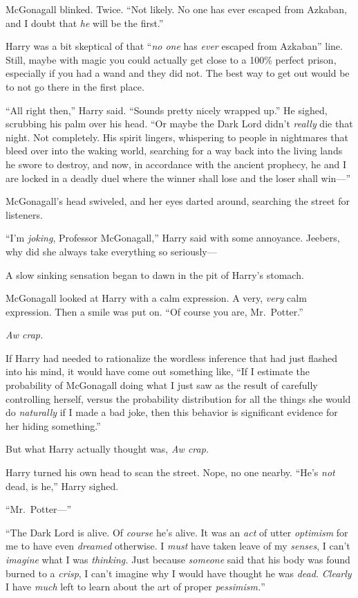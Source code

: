 McGonagall blinked. Twice. “Not likely. No one has ever escaped from Azkaban, and I doubt that \emph{he} will be the first.”

Harry was a bit skeptical of that “\emph{no one} has \emph{ever} escaped from Azkaban” line. Still, maybe with magic you could actually get close to a 100\% perfect prison, especially if you had a wand and they did not. The best way to get out would be to not go there in the first place.

“All right then,” Harry said. “Sounds pretty nicely wrapped up.” He sighed, scrubbing his palm over his head. “Or maybe the Dark Lord didn’t \emph{really} die that night. Not completely. His spirit lingers, whispering to people in nightmares that bleed over into the waking world, searching for a way back into the living lands he swore to destroy, and now, in accordance with the ancient prophecy, he and I are locked in a deadly duel where the winner shall lose and the loser shall win—”

McGonagall’s head swiveled, and her eyes darted around, searching the street for listeners.

“I’m \emph{joking}, Professor McGonagall,” Harry said with some annoyance. Jeebers, why did she always take everything so seriously—

A slow sinking sensation began to dawn in the pit of Harry’s stomach.

McGonagall looked at Harry with a calm expression. A very, \emph{very} calm expression. Then a smile was put on. “Of course you are, Mr.~Potter.”

\emph{Aw crap.}

If Harry had needed to rationalize the wordless inference that had just flashed into his mind, it would have come out something like, “If I estimate the probability of McGonagall doing what I just saw as the result of carefully controlling herself, versus the probability distribution for all the things she would do \emph{naturally} if I made a bad joke, then this behavior is significant evidence for her hiding something.”

But what Harry actually thought was, \emph{Aw crap.}

Harry turned his own head to scan the street. Nope, no one nearby. “He’s \emph{not} dead, is he,” Harry sighed.

“Mr.~Potter—”

“The Dark Lord is alive. Of \emph{course} he’s alive. It was an \emph{act} of utter \emph{optimism} for me to have even \emph{dreamed} otherwise. I \emph{must} have taken leave of my \emph{senses}, I can’t \emph{imagine} what I was \emph{thinking.} Just because \emph{someone} said that his body was found burned to a \emph{crisp}, I can’t imagine why I would have thought he was \emph{dead.} \emph{Clearly} I have \emph{much} left to learn about the art of proper \emph{pessimism.}”

